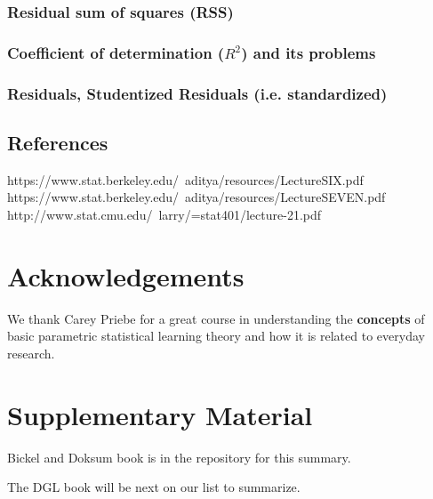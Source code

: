 \documentclass{article}
\theoremstyle{definition}
\theoremstyle{remark}
\newcommand{\beginsupplement}{%
        \setcounter{table}{0}
        \renewcommand{\thetable}{S\arabic{table}}%
        \setcounter{figure}{0}
        \renewcommand{\thefigure}{S\arabic{figure}}%
     }
\begin{document}
		\subsubsection{Residual sum of squares (RSS)}

		\subsubsection{Coefficient of determination ($R^2$) and its problems}

		\subsubsection{Residuals, Studentized Residuals (i.e. standardized)}

	\subsection{References}
		https://www.stat.berkeley.edu/~aditya/resources/LectureSIX.pdf
		https://www.stat.berkeley.edu/~aditya/resources/LectureSEVEN.pdf
		http://www.stat.cmu.edu/~larry/=stat401/lecture-21.pdf
		
\section{Acknowledgements}
  
  We thank Carey Priebe for a great course in understanding the \textbf{concepts} of basic parametric statistical learning theory and how it is related to everyday research. 



\newpage
\section{Supplementary Material}
\beginsupplement

Bickel and Doksum book is in the repository for this summary.

The DGL book will be next on our list to summarize.
  
\clearpage
\newpage
  
\end{document}
